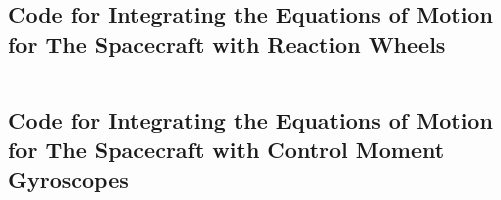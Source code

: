 \documentclass[12]{article}
\begin{document}
\inputminted{python}{code/files/no_actuation.py}

\subsection{Code for Integrating the Equations of Motion for The Spacecraft with Reaction Wheels}

\inputminted{python}{code/files/reaction.py}

\vfill\null

\subsection{Code for Integrating the Equations of Motion for The Spacecraft with Control Moment Gyroscopes}

\inputminted{python}{code/files/cmg.py}
\end{document}
